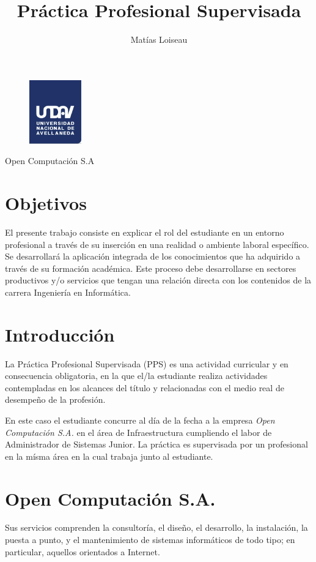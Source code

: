 \documentclass[12pt,a4paper]{article}
\author{Matías Loiseau}
\title{Práctica Profesional Supervisada}
\begin{document}
\begin{figure}
  \centering
   \includegraphics[width=0.2\textwidth]{undav-logo}
  \label{fig:ejemplo}
\end{figure}
\maketitle       %
\begin{center}
Open Computación S.A 
\end{center}
\cleardoublepage

\tableofcontents %
\cleardoublepage

\section{Objetivos}
El presente trabajo consiste en explicar el rol del estudiante en un entorno profesional a través de su inserción en una realidad o ambiente laboral específico. Se desarrollará la aplicación integrada de los conocimientos que ha adquirido a través de su formación académica. Este proceso debe desarrollarse en sectores productivos y/o servicios que tengan una relación directa con los contenidos de la carrera Ingeniería en Informática.

\section{Introducción}
La Práctica Profesional Supervisada (PPS) es una actividad curricular y en consecuencia obligatoria, en la que el/la estudiante realiza actividades contempladas en los alcances del título y relacionadas con el medio real de desempeño de la profesión.

En este caso el estudiante concurre al día de la fecha a la empresa \emph{Open Computación S.A.} en el área de Infraestructura cumpliendo el labor de Administrador de Sistemas Junior. La práctica es supervisada por un profesional en la mísma área en la cual trabaja junto al estudiante.

\section{Open Computación S.A.}
Sus servicios comprenden la consultoría, el diseño, el desarrollo, la instalación, la puesta a punto, y el mantenimiento de sistemas informáticos de todo tipo; en particular, aquellos orientados a Internet.
\end{document}
